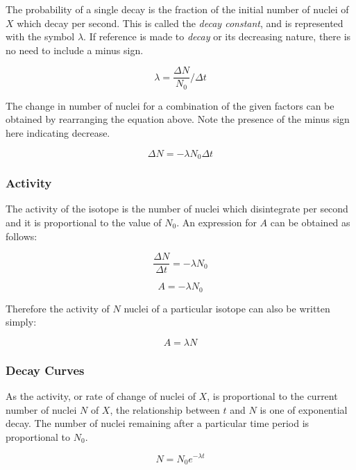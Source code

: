 \documentclass[12pt]{article}
\begin{document}
The probability of a single decay is the fraction of the initial number of nuclei of \(X\) which decay per second. This is called the \emph{decay constant}, and is represented with the symbol \(\lambda\). If reference is made to \emph{decay} or its decreasing nature, there is no need to include a minus sign.

\[\lambda = \dfrac{\Delta N}{N_0}/\Delta t\]

The change in number of nuclei for a combination of the given factors can be obtained by rearranging the equation above. Note the presence of the minus sign here indicating decrease.

\[ \Delta N = - \lambda N_0 \Delta t\]

\subsubsection{Activity}
\label{sec:org7507b55}

The activity of the isotope is the number of nuclei which disintegrate per second and it is proportional to the value of \(N_0\). An expression for \(A\) can be obtained as follows:

\[ \dfrac{\Delta N}{\Delta t} = - \lambda N_0\]

\[ A = - \lambda N_0\]

Therefore the activity of \(N\) nuclei of a particular isotope can also be written simply:

\[ A = \lambda N\]

\subsubsection{Decay Curves}
\label{sec:orgbc2b6bb}

As the activity, or rate of change of nuclei of \(X\), is proportional to the current number of nuclei \(N\) of \(X\), the relationship between \(t\) and \(N\) is one of exponential decay. The number of nuclei remaining after a particular time period is proportional to \(N_0\).

\[N = N_0 e^{- \lambda t}\]
\end{document}
